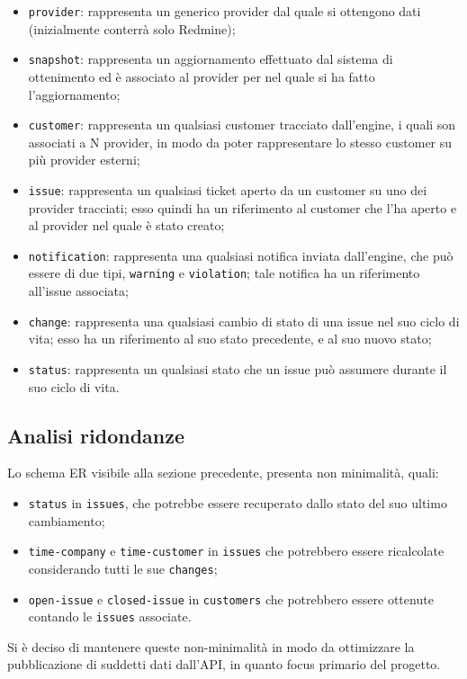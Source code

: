 	\begin{itemize}
		\item \texttt{provider}: rappresenta un generico provider dal quale si ottengono dati (inizialmente conterrà solo Redmine);
		\item \texttt{snapshot}: rappresenta un aggiornamento effettuato dal sistema di ottenimento ed è associato al provider per nel quale si ha fatto l'aggiornamento;
		\item \texttt{customer}: rappresenta un qualsiasi customer tracciato dall'engine, i quali son associati a N provider, in modo da poter rappresentare lo stesso customer su più provider esterni;
		\item \texttt{issue}: rappresenta un qualsiasi ticket aperto da un customer su uno dei provider tracciati; esso quindi ha un riferimento al customer che l'ha aperto e al provider nel quale è stato creato;
		\item \texttt{notification}: rappresenta una qualsiasi notifica inviata dall'engine, che può essere di due tipi, \texttt{warning} e \texttt{violation}; tale notifica ha un riferimento all'issue associata;
		\item \texttt{change}: rappresenta una qualsiasi cambio di stato di una issue nel suo ciclo di vita; esso ha un riferimento al suo stato precedente, e al suo nuovo stato;
		\item \texttt{status}: rappresenta un qualsiasi stato che un issue può assumere durante il suo ciclo di vita.
	\end{itemize}
	
    \subsection{Analisi ridondanze}
        Lo schema ER visibile alla sezione precedente, presenta non minimalità, quali:
        \begin{itemize}
            \item \texttt{status} in \texttt{issues}, che potrebbe essere recuperato dallo stato del suo ultimo cambiamento;
            \item \texttt{time-company} e \texttt{time-customer} in \texttt{issues} che potrebbero essere ricalcolate considerando tutti le sue \texttt{changes};
            \item \texttt{open-issue} e \texttt{closed-issue} in \texttt{customers} che potrebbero essere ottenute contando le \texttt{issues} associate.
        \end{itemize} 
        Si è deciso di mantenere queste non-minimalità in modo da ottimizzare la pubblicazione di suddetti dati dall'API, in quanto focus primario del progetto.
    








